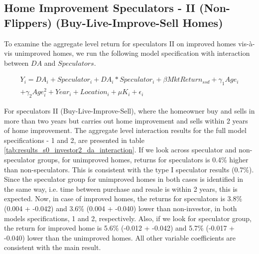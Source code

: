 \documentclass[AEJ,reqno, draftmode]{AEA} %
\begin{document}
\subsection{Home Improvement Speculators - II (Non-Flippers) (Buy-Live-Improve-Sell Homes)}

To examine the aggregate level return for speculators II on improved homes vis-à-vis unimproved homes, we run the following model specification with interaction between $DA$ and $Speculators$. 

\begin{equation} \label{eq: spec II}
\begin{aligned}
    Y_i = DA_i + Speculator_i + DA_i * Speculator_i + \beta{MktReturn_{ssd}} + \gamma_1{Age_i}\\ + \gamma_2{Age_i^2} + Year_i + Location_i + \mu{K_i} + \epsilon_i
\end{aligned}
\end{equation}

For speculators II (Buy-Live-Improve-Sell), where the homeowner buy and sells in more than two years but carries out home improvement and sells within 2 years of home improvement. The aggregate level interaction results for the full model specifications - 1 and 2, are presented in table \ref{tab:results_s0_investor2_da_interaction}. 
If we look across speculator and non-speculator groups, for unimproved homes, returns for speculators is 0.4\% higher than non-speculators. This is consistent with the type I speculator results (0.7\%). Since the speculator group for unimproved homes in both cases is identified in the same way, i.e. time between purchase and resale is within 2 years, this is expected. Now, in case of improved homes, the returns for speculators is 3.8\% (0.004 + -0.042) and 3.6\% (0.004 + -0.040) lower than non-investor, in both models specifications, 1 and 2, respectively. Also, if we look for speculator group, the return for improved home is 5.6\% (-0.012 + -0.042) and 5.7\% (-0.017 + -0.040) lower than the unimproved homes. All other variable coefficients are consistent with the main result. 


\restoregeometry
\end{document}
